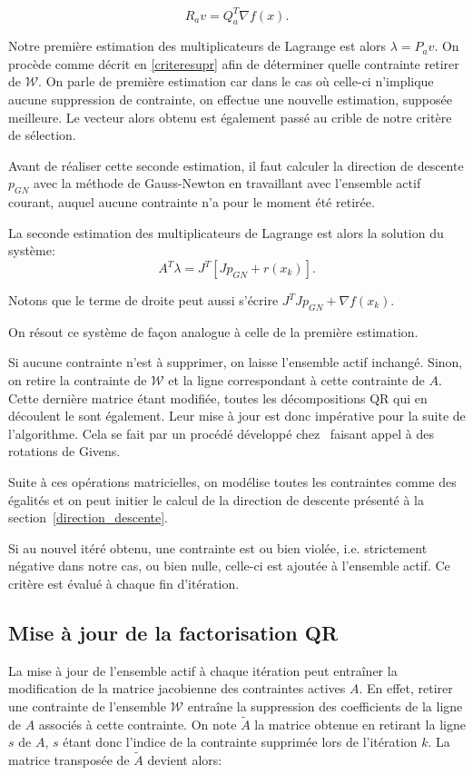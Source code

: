 $$ R_{a}v = Q_{a}^T\nabla f(x).$$
 
Notre première estimation des multiplicateurs de Lagrange est alors $\lambda=P_{a}v$. On procède comme décrit en \ref{criteresupr} afin de déterminer quelle contrainte retirer de $\mathcal{W}$. 
On parle de première estimation car dans le cas où celle-ci n'implique aucune suppression de contrainte, on effectue une nouvelle estimation, supposée meilleure.  
Le vecteur alors obtenu est également passé au crible de notre critère de sélection.

Avant de réaliser cette seconde estimation, il faut calculer la direction de descente $p_{GN}$ avec la méthode de Gauss-Newton en travaillant avec l'ensemble actif courant, 
auquel aucune contrainte n'a pour le moment été retirée.

La seconde estimation des multiplicateurs de Lagrange est alors la solution du système:
\begin{equation}
A^T\lambda = J^T\left[Jp_{GN} + r(x_{k})\right].
\end{equation}

Notons que le terme de droite peut aussi s'écrire $J^{T}Jp_{GN} + \nabla f(x_{k})$.

On résout ce système de façon analogue à celle de la première estimation. 

Si aucune contrainte n'est à supprimer, on laisse l'ensemble actif inchangé. Sinon, on retire la contrainte de $\mathcal{W}$ et la ligne correspondant 
à cette contrainte de $A$. 
Cette dernière matrice étant modifiée, toutes les décompositions QR qui en découlent le sont également. Leur mise à jour est donc impérative pour la suite de l'algorithme.
Cela se fait par un procédé développé chez~\citet{goluvanl13} faisant appel à des rotations de Givens.

Suite à ces opérations matricielles, on modélise toutes les contraintes comme des égalités et on peut initier le calcul de la direction de descente présenté à la section~\ref{direction_descente}.

Si au nouvel itéré obtenu, une contrainte est ou bien violée, i.e. strictement négative dans notre cas, ou bien nulle, celle-ci est ajoutée à l'ensemble actif.
Ce critère est évalué à chaque fin d'itération.

\subsection{Mise à jour de la factorisation QR}

La mise à jour de l'ensemble actif à chaque itération peut entraîner la modification de la matrice jacobienne des contraintes actives $A$. En effet, 
retirer une contrainte de l'ensemble $\mathcal{W}$ entraîne la suppression des coefficients de la ligne de $A$ associés à cette contrainte. 
On note $\tilde{A}$ la matrice obtenue en retirant la ligne $s$ de $A$, $s$ étant donc l'indice de la contrainte supprimée lors de l'itération $k$. 
La matrice transposée de $\tilde{A}$ devient alors:

